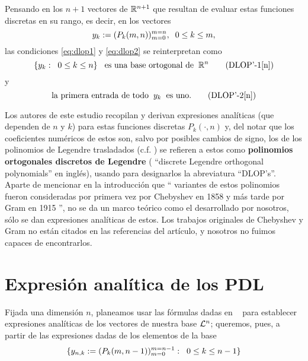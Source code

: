 Pensando en los 
$n+1$ vectores de $\mathbb{R}^{n+1}$ que resultan
de evaluar estas funciones discretas en su rango,
es decir, en los vectores
\begin{equation}
y_{k}:= (P_{k}(m, n))_{m=0}^{m=n}, \hspace{0.2cm}
0 \leq k \leq m,
\end{equation}
las condiciones \eqref{eq:dlop1} y \eqref{eq:dlop2}
se reinterpretan como
\begin{equation}
\{ y_{k}: \hspace{0.2cm} 0 \leq k \leq n\}
\hspace{0.3cm} \text{es una
base ortogonal de} \hspace{0.2cm} \mathbb{R}^{n}
\tag{DLOP'-1[n]} \label{eq:dlop'1}
\end{equation}
y 
\begin{equation}
\text{la primera
entrada de todo} \hspace{0.2cm} y_{k} \hspace{0.2cm}
\text{es uno.} 
\tag{DLOP'-2[n]} \label{eq:dlop'2}
\end{equation}


Los autores de este estudio recopilan y derivan expresiones
analíticas (que dependen de $n$ y $k$) para estas funciones
discretas $P_{k}(\cdot ,n)$ y, del notar que los coeficientes
numéricos de estos son, salvo por posibles cambios de signo,
los de los polinomios de Legendre trasladados 
(c.f. \cite{leg})
se refieren a 
estos como \textbf{polinomios ortogonales
discretos de Legendre} (
``discrete Legendre orthogonal
polynomials'' en inglés), usando para designarlos la abreviatura
``DLOP's''. \\

Aparte de mencionar en la introducción que
`` variantes de estos polinomios fueron consideradas por primera
vez por Chebyshev en 1858 y más tarde por Gram en 1915 '', no se
da un marco teórico como el desarrollado por nosotros, sólo 
se dan expresiones analíticas de estos.
Los trabajos originales de Chebyshev y Gram
no están citados en las referencias del artículo, y 
nosotros no fuimos capaces de 
encontrarlos.


\section{Expresión analítica de los PDL}
Fijada una dimensión $n$, planeamos usar 
las fórmulas dadas 
en ~\cite{Neuman}
para establecer expresiones analíticas
de los vectores de nuestra base $\mathcal{L}^{n}$; queremos,
pues, a partir de las expresiones dadas de los
elementos de la base
\begin{equation}
\label{eq: base DLOP}
\{
y_{n,k}:= (P_{k}(m, n-1))_{m=0}^{m=n-1}
: \hspace{0.2cm} 0 \leq k \leq n-1
\}
\end{equation}

